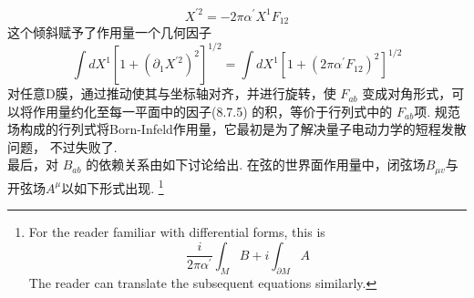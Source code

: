 \begin{equation}
	X^{\prime 2}=-2 \pi \alpha^{\prime} X^{1} F_{12}
\end{equation}
这个倾斜赋予了作用量一个几何因子
\begin{equation}
	\int d X^{1}\left[1+\left(\partial_{1} X^{\prime 2}\right)^{2}\right]^{1 / 2}=\int d X^{1}\left[1+\left(2 \pi \alpha^{\prime} F_{12}\right)^{2}\right]^{1 / 2}
\end{equation}
对任意D膜，通过推动使其与坐标轴对齐，并进行旋转，使 $F_{a b}$ 变成对角形式，可以将作用量约化至每一平面中的因子(8.7.5) 的积，等价于行列式中的 $F_{a b}$项. 规范场构成的行列式将Born-Infeld作用量，它最初是为了解决量子电动力学的短程发散问题， 不过失败了.\\
最后，对 $B_{a b}$ 的依赖关系由如下讨论给出. 在弦的世界面作用量中，闭弦场$B_{\mu v}$与开弦场$A^{\mu}$以如下形式出现.
\footnote{For the reader familiar with differential forms, this is
	$$\frac{i}{2 \pi \alpha^{\prime}} \int_{M} B+i \int_{\partial M} A$$
The reader can translate the subsequent equations similarly.}

